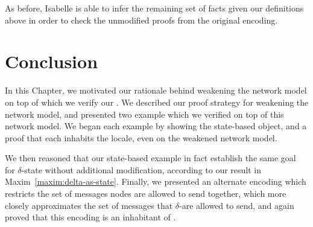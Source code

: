 As before, Isabelle is able to infer the remaining set of facts given our
definitions above in order to check the unmodified proofs from the original
encoding.

\section{Conclusion}

In this Chapter, we motivated our rationale behind weakening the network model
on top of which we verify our \CRDTs. We described our proof strategy for
weakening the network model, and presented two example \CRDTs which we verified
on top of this network model. We began each example by showing the state-based
object, and a proof that each \CRDT inhabits the \SEC locale, even on the
weakened network model.

We then reasoned that our state-based example \CRDTs in fact establish the same
goal for $\delta$-state \CRDTs without additional modification, according to our
result in Maxim~\ref{maxim:delta-as-state}. Finally, we presented an alternate
encoding which restricts the set of messages nodes are allowed to send together,
which more closely approximates the set of messages that $\delta$-\CRDTs are
allowed to send, and again proved that this encoding is an inhabitant of \SEC.
